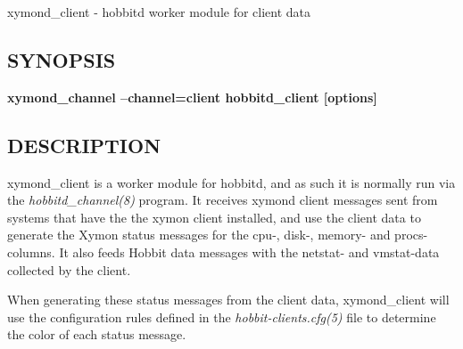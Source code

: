  xymond\_client - hobbitd worker module for client data 
\subsection{SYNOPSIS}
\textbf{xymond\_channel --channel=client hobbitd\_client [options]}


 
\subsection{DESCRIPTION}
 xymond\_client is a worker module for hobbitd, and as such it is normally run via the \emph{hobbitd\_channel(8)}
 program. It receives xymond client messages sent from systems that have the the xymon client installed, and use the client data to generate the Xymon status messages for the cpu-, disk-, memory- and procs-columns. It also feeds Hobbit data messages with the netstat- and vmstat-data collected by the client. 

  When generating these status messages from the client data, xymond\_client will use the configuration rules defined in the \emph{hobbit-clients.cfg(5)}
 file to determine the color of each status message. 


 
